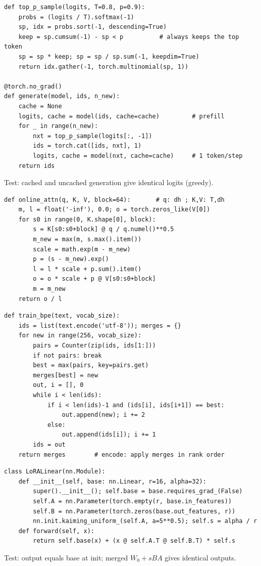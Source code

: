 \begin{lstlisting}
def top_p_sample(logits, T=0.8, p=0.9):
    probs = (logits / T).softmax(-1)
    sp, idx = probs.sort(-1, descending=True)
    keep = sp.cumsum(-1) - sp < p          # always keeps the top token
    sp = sp * keep; sp = sp / sp.sum(-1, keepdim=True)
    return idx.gather(-1, torch.multinomial(sp, 1))

@torch.no_grad()
def generate(model, ids, n_new):
    cache = None
    logits, cache = model(ids, cache=cache)         # prefill
    for _ in range(n_new):
        nxt = top_p_sample(logits[:, -1])
        ids = torch.cat([ids, nxt], 1)
        logits, cache = model(nxt, cache=cache)     # 1 token/step
    return ids
\end{lstlisting}
{\scriptsize\color{mute}Test: cached and uncached generation give identical logits (greedy).}

\begin{lstlisting}
def online_attn(q, K, V, block=64):       # q: dh ; K,V: T,dh
    m, l = float('-inf'), 0.0; o = torch.zeros_like(V[0])
    for s0 in range(0, K.shape[0], block):
        s = K[s0:s0+block] @ q / q.numel()**0.5
        m_new = max(m, s.max().item())
        scale = math.exp(m - m_new)
        p = (s - m_new).exp()
        l = l * scale + p.sum().item()
        o = o * scale + p @ V[s0:s0+block]
        m = m_new
    return o / l
\end{lstlisting}

\begin{lstlisting}
def train_bpe(text, vocab_size):
    ids = list(text.encode('utf-8')); merges = {}
    for new in range(256, vocab_size):
        pairs = Counter(zip(ids, ids[1:]))
        if not pairs: break
        best = max(pairs, key=pairs.get)
        merges[best] = new
        out, i = [], 0
        while i < len(ids):
            if i < len(ids)-1 and (ids[i], ids[i+1]) == best:
                out.append(new); i += 2
            else:
                out.append(ids[i]); i += 1
        ids = out
    return merges        # encode: apply merges in rank order
\end{lstlisting}

\begin{lstlisting}
class LoRALinear(nn.Module):
    def __init__(self, base: nn.Linear, r=16, alpha=32):
        super().__init__(); self.base = base.requires_grad_(False)
        self.A = nn.Parameter(torch.empty(r, base.in_features))
        self.B = nn.Parameter(torch.zeros(base.out_features, r))
        nn.init.kaiming_uniform_(self.A, a=5**0.5); self.s = alpha / r
    def forward(self, x):
        return self.base(x) + (x @ self.A.T @ self.B.T) * self.s
\end{lstlisting}
{\scriptsize\color{mute}Test: output equals base at init; merged $W_0+sBA$ gives identical outputs.}

